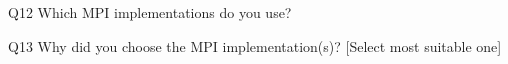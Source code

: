 \begin{description}%
\item{Q12} Which MPI implementations do you use?%
\item{Q13} Why did you choose the MPI implementation(s)? [Select most suitable one]%
\end{description}%
